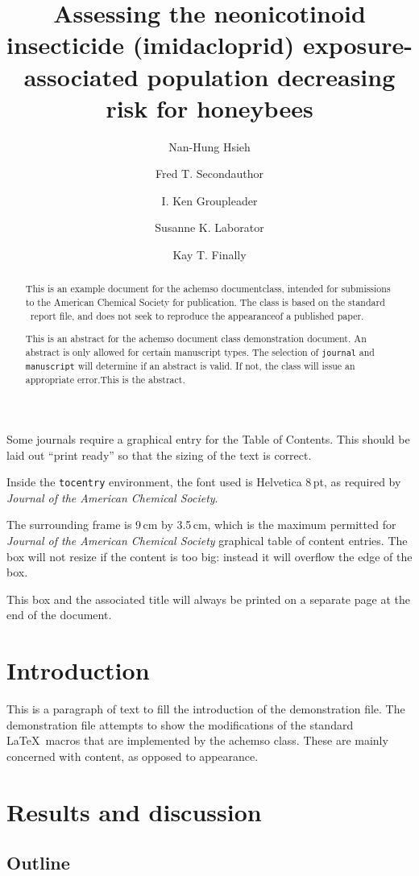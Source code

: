 \documentclass[journal=jacsat,manuscript=article]{achemso}
\author{Nan-Hung Hsieh}
\affiliation{Department of Veterinary Integrative Biosciences}
\author{Fred T. Secondauthor}
\author{I. Ken Groupleader}
\affiliation{Department of Chemistry, Unknown University, Unknown Town}
\author{Susanne K. Laborator}
\affiliation{Lead Discovery, BigPharma, Big Town, USA}
\author{Kay T. Finally}
\affiliation{Department of Chemistry, Unknown University, Unknown Town}
\title[An \textsf{achemso} demo]{Assessing the neonicotinoid insecticide (imidacloprid)
exposure-associated population decreasing risk for honeybees}
\begin{document}
\begin{abstract}
This is an example document for the \textsf{achemso} documentclass,
intended for submissions to the American Chemical Society for
publication. The class is based on the standard \LaTeXe~\textsf{report}
file, and does not seek to reproduce the appearanceof a published paper.

This is an abstract for the \textsf{achemso} document class
demonstration document. An abstract is only allowed for certain
manuscript types. The selection of \texttt{journal} and
\texttt{manuscript} will determine if an abstract is valid. If not, the
class will issue an appropriate error.This is the abstract.
\end{abstract}
\begin{tocentry}
Some journals require a graphical entry for the Table of Contents.
This should be laid out ``print ready'' so that the sizing of the
text is correct.

Inside the \texttt{tocentry} environment, the font used is Helvetica
8\,pt, as required by \emph{Journal of the American Chemical
Society}.

The surrounding frame is 9\,cm by 3.5\,cm, which is the maximum
permitted for  \emph{Journal of the American Chemical Society}
graphical table of content entries. The box will not resize if the
content is too big: instead it will overflow the edge of the box.

This box and the associated title will always be printed on a
separate page at the end of the document.
\end{tocentry}

\section{Introduction}\label{introduction}

This is a paragraph of text to fill the introduction of the
demonstration file. The demonstration file attempts to show the
modifications of the standard \LaTeX~macros that are implemented by the
\textsf{achemso} class. These are mainly concerned with content, as
opposed to appearance.

\section{Results and discussion}\label{results-and-discussion}

\subsection{Outline}\label{outline}
\end{document}
